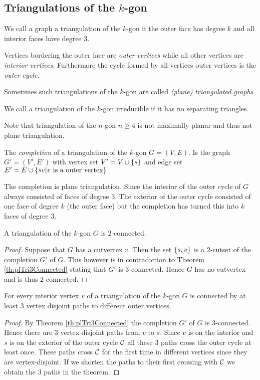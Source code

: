\subsection{Triangulations of the $k$-gon}

\begin{defi}
We call a graph a triangulation of the $k$-gon if the outer face has degree $k$ and all interior faces have degree $3$.
\end{defi}
Vertices bordering the outer face are \emph{outer vertices} while all other vertices are \emph{interior vertices}. Furthermore the cycle formed by all vertices outer vertices is the \emph{outer cycle}.

Sometimes such triangulations of the $k$-gon are called \emph{(plane) triangulated graphs}.


\begin{defi}
We call a triangulation of the $k$-gon irreducible if it has no separating triangles.
\end{defi}


Note that triangulation of the $n$-gon $n\geq 4$ is not maximally planar and thus not plane triangulation.

The \emph{completion} of a triangulation of the $k$-gon $G = (V, E)$. Is the graph $G'= (V', E')$ with vertex set $V' = V \cup \left\lbrace {s} \right\rbrace$ and edge set $E' = E \cup \left\lbrace { sv | v \text{ is a outer vertex}} \right\rbrace$

The completion is plane triangulation.  %
Since the interior of the outer cycle of $G$ always consisted of faces of degree 3. The exterior of the outer cycle consisted of one face of degree $k$ (the outer face) but the completion has turned this into $k$ faces of degree $3$.

\begin{thrm}
A triangulation of the $k$-gon $G$ is $2$-connected.
\end{thrm}
\begin{proof}
Suppose that $G$ has a cutvertex $v$. Then the set $\left\lbrace {s, v} \right\rbrace$ is a $2$-cutset of the completion $G'$ of $G$. This however is in contradiction to Theorem \ref{th:plTri3Connected} stating that $G'$ is $3$-connected. Hence $G$ has no cutvertex and is thus $2$-connected.
\end{proof}

\begin{thrm}
  \label{th:triOfK3:VertexDisjointPaths}
  For every interior vertex $v$ of a triangulation of the $k$-gon $G$ is connected by at least $3$ vertex disjoint paths to different outer vertices.
\end{thrm}
\begin{proof}
By Theorem \ref{th:plTri3Connected} the completion $G'$ of $G$ is $3$-connected. Hence there are 3 vertex-disjoint paths from $v$ to $s$. Since $v$ is on the interior and $s$ is on the exterior of the outer cycle $\mathcal{C}$ all these 3 paths cross the outer cycle at least once. These paths cross $\mathcal{C}$ for the first time in different vertices since they are vertex-disjoint. If we shorten the paths to their first crossing with $\mathcal{C}$ we obtain the $3$ paths in the theorem.
\end{proof}

